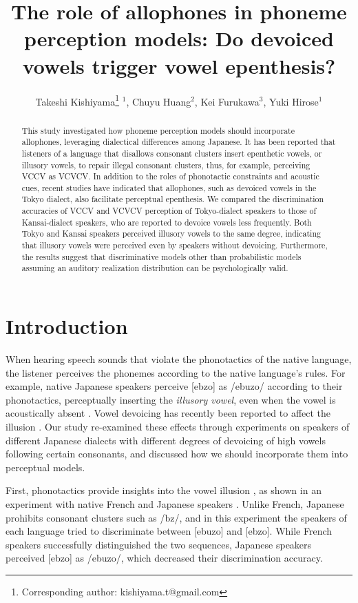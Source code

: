 \documentclass[a4paper,11pt,twocolumn]{article}
\title{The role of allophones in phoneme perception models: Do devoiced vowels trigger vowel epenthesis?}
\author{
    Takeshi Kishiyama\thanks{Corresponding author: kishiyama.t@gmail.com}  $^1$,
    Chuyu Huang$^2$,
    Kei Furukawa$^3$,
    Yuki Hirose$^1$}
\begin{document}
\maketitle

\begin{abstract}
This study investigated how phoneme perception models should incorporate allophones, leveraging dialectical differences among Japanese. It has been reported that listeners of a language that disallows consonant clusters insert epenthetic vowels, or illusory vowels, to repair illegal consonant clusters, thus, for example, perceiving VCCV as VCVCV. In addition to the roles of phonotactic constraints and acoustic cues, recent studies have indicated that allophones, such as devoiced vowels in the Tokyo dialect, also facilitate perceptual epenthesis. We compared the discrimination accuracies of VCCV and VCVCV perception of Tokyo-dialect speakers to those of Kansai-dialect speakers, who are reported to devoice vowels less frequently. Both Tokyo and Kansai speakers perceived illusory vowels to the same degree, indicating that illusory vowels were perceived even by speakers without devoicing. Furthermore, the results suggest that discriminative models other than probabilistic models assuming an auditory realization distribution can be psychologically valid.
\end{abstract}


\section{Introduction}

When hearing speech sounds that violate the phonotactics of the native language, the listener perceives the phonemes according to the native language's rules. For example, native Japanese speakers perceive [ebzo] as /ebuzo/ according to their phonotactics, perceptually inserting the \textit{illusory vowel}, even when the vowel is acoustically absent \cite{dupoux1999epentheticvi, dupoux2011illusory}. Vowel devoicing has recently been reported to affect the illusion \cite{kilpatrick2018japanese}. Our study re-examined these effects through experiments on speakers of different Japanese dialects with different degrees of devoicing of high vowels following certain consonants, and discussed how we should incorporate them into perceptual models.

First, phonotactics provide insights into the vowel illusion \cite{halle2014special, monahan2009not, mattingley2015influence}, as shown in an experiment with native French and Japanese speakers \cite{dupoux1999epentheticvi}. Unlike French, Japanese prohibits consonant clusters such as /bz/, and in this experiment the speakers of each language tried to discriminate between [ebuzo] and [ebzo]. While French speakers successfully distinguished the two sequences, Japanese speakers perceived [ebzo] as /ebuzo/, which decreased their discrimination accuracy.
\end{document}
